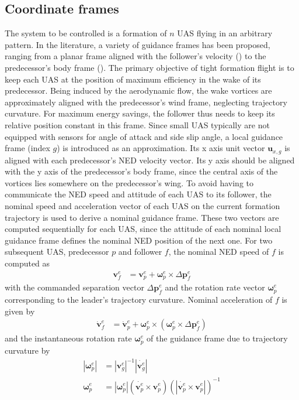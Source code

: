 \documentclass{ifacconf}
\newcommand{\mbf}[1]{\mathbf{#1}}
\providecommand{\mbf}[1]{\mathbf{#1}}
\begin{document}
\subsection{Coordinate frames}
The system to be controlled is a formation of $n$ UAS flying in an arbitrary pattern. In the literature, a variety of guidance frames has been proposed, ranging from a planar frame aligned with the follower's velocity (\cite{gu2006design}) to the predecessor's body frame (\cite{schumacher2000adaptive}).
The primary objective of tight formation flight is to keep each UAS at the position of maximum efficiency in the wake of its predecessor.
Being induced by the aerodynamic flow, the wake vortices are approximately aligned with the predecessor's wind frame, neglecting trajectory curvature. 
For maximum energy savings, the follower thus needs to keep its relative position constant in this frame. Since small UAS typically are not equipped with sensors for angle of attack and side slip angle, a local guidance frame (index $g$) is introduced as an approximation. Its x axis unit vector $\mbf{u}_{x,g}$ is aligned with each predecessor's NED velocity vector. Its y axis should be aligned with the y axis of the predecessor's body frame, since the central axis of the vortices lies somewhere on the predecessor's wing.
To avoid having to communicate the NED speed and attitude of each UAS to its follower, the nominal speed and acceleration vector of each UAS on the current formation trajectory is used to derive a nominal guidance frame.
These two vectors are computed sequentially for each UAS, since the attitude of each nominal local guidance frame defines the nominal NED position of the next one.
For two subsequent UAS, predecessor $p$ and follower $f$, the nominal NED speed of $f$ is computed as
\begin{align}
\mbf{v}_f^e &= \mbf{v}_p^e + \mbf{\omega}_p^e \times \Delta \mbf{p}_f^e 
\end{align}
with the commanded separation vector $\Delta \mbf{p}_f^e$ and the rotation rate vector $\mbf{\omega}_p^e$ corresponding to the leader's trajectory curvature. Nominal acceleration of $f$ is given by
\begin{align}
\dot{\mbf{v}}_f^e &= \dot{\mbf{v}}_p^e + \mbf{\omega}_p^e \times (\mbf{\omega}_p^e \times \Delta \mbf{p}^e_f)
\end{align}
and the instantaneous rotation rate $\mbf{\omega}_p^e$ of the guidance frame due to trajectory curvature by
\begin{align}
|\mbf{\omega}_p^e| &= {|{\mbf{v}_g^e}|}^{-1}{|\dot{\mbf{v}_g^e}|}\\
\mbf{\omega}_p^e &= 
|\mbf{\omega}_p^e| 
({\dot{\mbf{v}_p^e} \times \mbf{v}_p^e})({|\dot{\mbf{v}_p^e} \times \mbf{v}_p^e|})^{-1}
\end{align}
\end{document}
